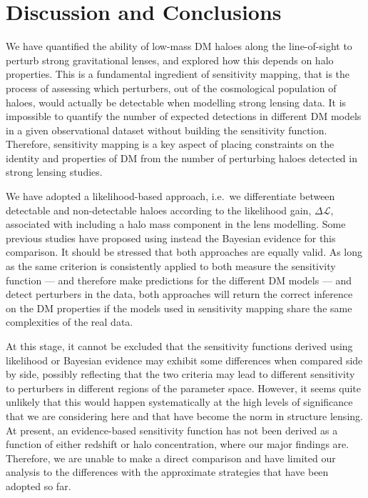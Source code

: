 \documentclass[a4paper, fleqn, usenatbib, useAMS]{mnras}
\def\DL{\Delta\mathscr{L}}
\begin{document}
\section{Discussion and Conclusions}

We have quantified the ability of low-mass DM haloes along the
line-of-sight to perturb strong gravitational lenses, and explored how
this depends on halo properties.  This is a fundamental ingredient of
sensitivity mapping, that is the process of assessing which
perturbers, out of the cosmological population of haloes, would
actually be detectable when modelling strong lensing data.  It is
impossible to quantify the number of expected detections in different
DM models in a given observational dataset without building the 
sensitivity function. Therefore, sensitivity mapping is a key aspect
of placing constraints on the identity and properties of DM from the
number of perturbing haloes detected in strong lensing studies.

We have adopted a likelihood-based approach, i.e.\ we differentiate
between detectable and non-detectable haloes according to the likelihood
gain, $\DL$, associated with including a halo mass component in the
lens modelling. Some previous studies have proposed using instead the Bayesian
evidence for this comparison. It should be stressed that
both approaches are equally valid. As long as the same criterion is
consistently applied to both measure the sensitivity function — and
therefore make predictions for the different DM models — and detect
 perturbers in the data, both approaches will return the correct inference on the DM properties {if the models used in sensitivity mapping 
 share the same complexities of the real data}. 
 
At this stage, it cannot be excluded that the sensitivity functions
derived using likelihood or Bayesian evidence may exhibit some
differences when compared side by side, possibly reflecting that the
two criteria may lead to different sensitivity to  perturbers
in different regions of the parameter space. However, it seems quite
unlikely that this would happen systematically at the high levels of
significance that we are considering here and that have become the
norm in structure lensing. At present, an evidence-based sensitivity function
has not been derived as a function of either redshift or halo
concentration, where our major findings are. Therefore, we are unable
to make a direct comparison and have  limited our analysis to the differences with the approximate strategies that have been adopted so far.
\end{document}
